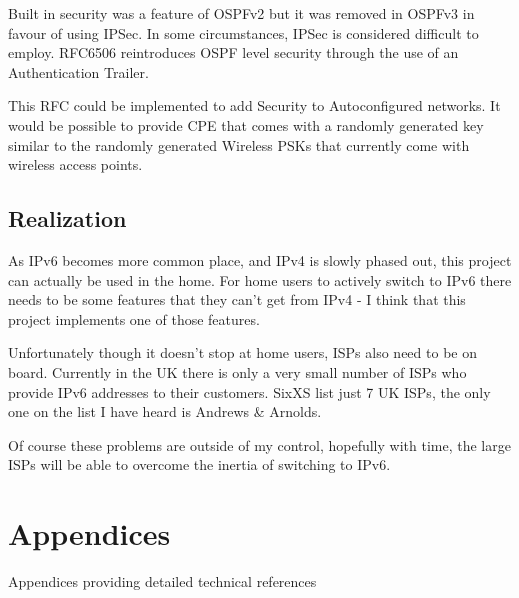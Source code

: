 \documentclass[12pt]{report}
\begin{document}
Built in security was a feature of OSPFv2 but it was removed in OSPFv3 in favour of 
using IPSec. In some circumstances, IPSec is considered difficult to employ. 
RFC6506 reintroduces OSPF level security through the use of an Authentication 
Trailer. 

This RFC could be implemented to add Security to Autoconfigured networks. It would 
be possible to provide CPE that comes with a randomly generated key similar to the 
randomly generated Wireless PSKs that currently come with wireless access points.

\section{Realization}
As IPv6 becomes more common place, and IPv4 is slowly phased out, this project can 
actually be used in the home. For home users to actively switch to IPv6 there needs 
to be some features that they can't get from IPv4 - I think that this project 
implements one of those features.

Unfortunately though it doesn't stop at home users, ISPs also need to be on
board.  Currently in the UK there is only a very small number of ISPs who
provide IPv6 addresses to their customers. SixXS list just 7 UK ISPs, the only
one on the list I have heard is Andrews \& Arnolds.

Of course these problems are outside of my control, hopefully with time, the
large ISPs will be able to overcome the inertia of switching to IPv6.
 
\pagebreak

\printnomenclature

\pagebreak

{}


\appendix 

\chapter{Appendices}
Appendices providing detailed technical references
\end{document}
